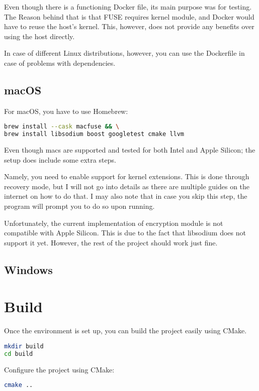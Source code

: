 Even though there is a functioning Docker file, its main purpose was for testing.
The Reason behind that is that FUSE requires kernel module, and Docker would have to reuse the host's kernel.
This, however, does not provide any benefits over using the host directly.

In case of different Linux distributions, however, you can use the Dockerfile in case of problems with dependencies.

\subsection*{macOS}

For macOS, you have to use Homebrew:

\begin{lstlisting}[language=bash, basicstyle=\ttfamily\small]
brew install --cask macfuse && \
brew install libsodium boost googletest cmake llvm
\end{lstlisting}

Even though macs are supported and tested for both Intel and Apple Silicon; the setup does include some extra steps.

Namely, you need to enable support for kernel extensions.
This is done through recovery mode, but I will not go into details as there are multiple guides on the internet on how to do that\cite{macos-kext}.
I may also note that in case you skip this step, the program will prompt you to do so upon running.

Unfortunately, the current implementation of encryption module is not compatible with Apple Silicon.
This is due to the fact that libsodium does not support it yet.
However, the rest of the project should work just fine.

\subsection*{Windows}


\section{Build}\label{sec:build}

Once the environment is set up, you can build the project easily using CMake.

\begin{lstlisting}[language=bash, basicstyle=\ttfamily\small]
mkdir build
cd build
\end{lstlisting}

Configure the project using CMake:

\begin{lstlisting}[language=bash, basicstyle=\ttfamily\small]
cmake ..
\end{lstlisting}


